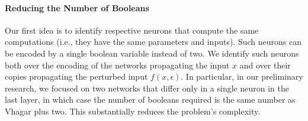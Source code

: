 \paragraph{Reducing the Number of Booleans}
Our first idea is to identify respective neurons that compute the same computations (i.e., they have the same parameters and inputs). 
Such neurons can be encoded by a single boolean variable instead of two. 
We identify such neurons both over the encoding of the networks propagating the input $x$ and over their copies propagating the perturbed input $f(x,\epsilon)$. 
In particular, in our preliminary research, we focused on two networks that differ only in a single neuron in the last layer, in which case the number of booleans required is the same number as Vhagar plus two. This substantially reduces the problem's complexity.

